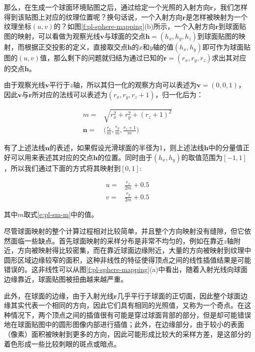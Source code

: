 那么，在生成一个球面环境贴图之后，通过给定一个光照的入射方向$\mathbf{r}$，我们怎样得到该贴图上对应的纹理位置呢？换句话说，一个入射方向$\mathbf{r}$是怎样被映射为一个纹理坐标$(u,v)$的？如图\ref{f:pl-sphere-mapping}(b)所示，一个入射方向$\mathbf{r}$到球面贴图的映射，可以看做为观察光线$\mathbf{v}$与球面的交点$\mathbf{h}=(h_x,h_y,h_z)$到球面贴图的映射，而根据正交投影的定义，直接取交点$\mathbf{h}$的$x$和$y$轴的值$(h_x,h_y)$即可作为球面贴图的$(u,v)$值，那么剩下的问题就归结为通过已知的$\mathbf{r}=(r_x,r_y,r_z)$求出其对应的交点$\mathbf{h}$。

由于观察光线$\mathbf{v}$平行于$z$轴，所以其归一化的观察方向可以表述为$\mathbf{v}=(0,0,1)$，因此$\mathbf{v}$与$\mathbf{r}$所对应的法线可以表述为$(r_x,r_y,r_z+1)$，归一化后为：

\begin{equation}\label{e:pl-sm-m}
	\begin{aligned}
		m=&\sqrt{r^{2}_x+r^{2}_y+(r_z+1)^{2}}\\
		\mathbf{n}=&\Bigg(\frac{r_x}{m},\frac{r_y}{m},\frac{r_z+1}{m}\Bigg)
	\end{aligned}
\end{equation}

有了上述法线$\mathbf{n}$的表述，如果假设光滑球面的半径为1，则上述法线$\mathbf{h}$中的分量值正好可以用来表述其对应的交点$\mathbf{h}$的位置。同时由于$(h_x,h_y)$的取值范围为$[-1,1]$，所以我们通过下面的方式将其映射到$[0,1]$:

\begin{equation}
	\begin{aligned}
		u=&\frac{r_x}{2m}+0.5\\
		v=&\frac{r_y}{2m}+0.5
	\end{aligned}
\end{equation}

其中$m$取式\ref{e:pl-sm-m}中的值。

尽管球面映射的整个计算过程相对比较简单，并且整个方向映射没有缝隙，但它依然面临一些缺点。首先球面映射的采样分布是非常不均匀的，例如在靠近$z$轴附近，方向被映射得比较密集，而在靠近球面边缘附近，大量的方向被映射到纹理中圆形区域边缘较窄的面积，这种非线性的特征使得顶点之间的线性插值结果是可能错误的。这非线性可以从图\ref{f:pl-sphere-mapping}(a)中看出，随着入射光线向球面边缘靠近，球面贴图被扭曲越来越严重。

此外，在球面的边缘，由于入射光线$\mathbf{r}$几乎平行于球面的正切面，因此整个球面边缘其实代表一个相同的方向，因此它们具有相同的光照值，又称为一个奇点。在这种情况下，两个顶点之间的插值很有可能是穿过球面背部的部分，但是却可能错误地在球面贴图中的圆形图像内部进行插值\cite{a:Reflectionvectorshadinghardware}；此外，在边缘部分，由于较小的表面（像素）面积被映射到更多的方向，因此可能形成比较大的采样方差，是这部分的着色形成一些比较刺眼的斑点或暗点。

